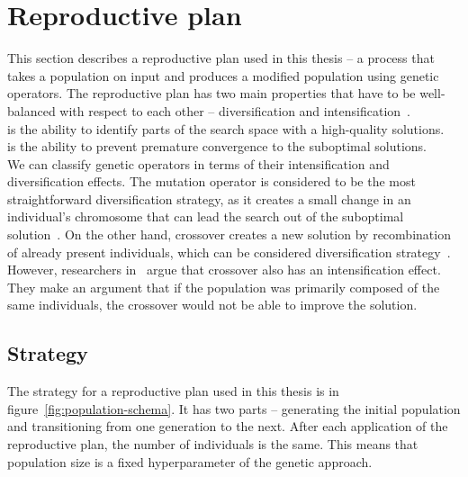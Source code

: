 \clearpage%
\newpage
\section{Reproductive plan}\label{sec:reproductive-plan}

This section describes a reproductive plan used in this thesis
– a process that takes a population on input and produces a modified population using genetic operators.
The reproductive plan has two main properties that have to be well-balanced with respect to each other
– diversification and intensification~\cite{blumMetaheuristicsCombinatorialOptimization2003}.\\

 is the ability to identify parts of the search space with a high-quality
solutions.\\

 is the ability to prevent premature convergence to the suboptimal solutions.\\

We can classify genetic operators in terms of their intensification and diversification effects.
The mutation operator is considered to be the most straightforward diversification strategy,
as it creates a small change in an individual's chromosome that can lead the search out of the suboptimal solution~\cite{blumMetaheuristicsCombinatorialOptimization2003}.
On the other hand, crossover creates a new solution by recombination of already present
individuals, which can be considered diversification strategy~\cite{blumMetaheuristicsCombinatorialOptimization2003}.
However, researchers in~\cite{hanshengBalanceExplorationExploitation1999} argue that crossover
also has an intensification effect.
They make an argument that if the population was primarily composed of the same individuals, the crossover would not be able to improve the solution.

\subsection{Strategy}\label{subsec:strategy}
The strategy for a reproductive plan used in this thesis is in figure~\ref{fig:population-schema}.
It has two parts – generating the initial population and transitioning from one generation to the next.
After each application of the reproductive plan, the number of individuals is the same.
This means that population size is a fixed hyperparameter of the genetic approach.

